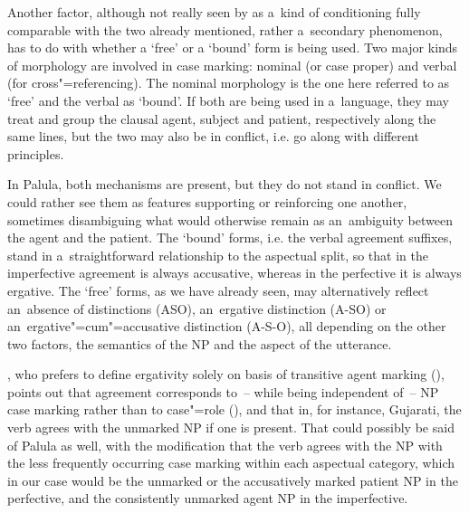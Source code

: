 Another factor, although not really seen by \citet[94]{dixon1994} as a~kind of conditioning fully comparable with the two already mentioned, rather a~secondary phenomenon, has to do with whether a `free' or a `bound' form is being used. Two major kinds of morphology are involved in case marking: nominal (or case proper) and verbal (for cross"=referencing). The nominal morphology is the one here referred to as `free' and the verbal as `bound'. If both are being used in a~language, they may treat and group the clausal agent, subject and patient, respectively along the same lines, but the two may also be in conflict, i.e. go along with different principles. 



In Palula, both mechanisms are present, but they do not stand in conflict. We could rather see them as features supporting or reinforcing one another, sometimes disambiguing what would otherwise remain as an~ambiguity between the agent and the patient. The `bound' forms, i.e. the verbal agreement suffixes, stand in a~straightforward relationship to the aspectual split, so that in the imperfective agreement is always accusative, whereas in the perfective it is always ergative. The `free' forms, as we have already seen, may alternatively reflect an~absence of distinctions (ASO), an~ergative distinction (A-SO) or an~ergative"=cum"=accusative distinction (A-S-O), all depending on the other two factors, the semantics of the NP and the aspect of the utterance. 



\citeauthor{delancey1981}, who prefers to define ergativity solely on basis of transitive agent marking (\citeyear[628]{delancey1981}), points out that agreement corresponds to~-- while being independent of~-- NP case marking rather than to case"=role (\citeyear[631]{delancey1981}), and that in, for instance, Gujarati, the verb agrees with the unmarked NP if one is present. That could possibly be said of Palula as well, with the modification that the verb agrees with the NP with the less frequently occurring case marking within each aspectual category, which in our case would be the unmarked or the accusatively marked patient NP in the perfective, and the consistently unmarked agent NP in the imperfective.